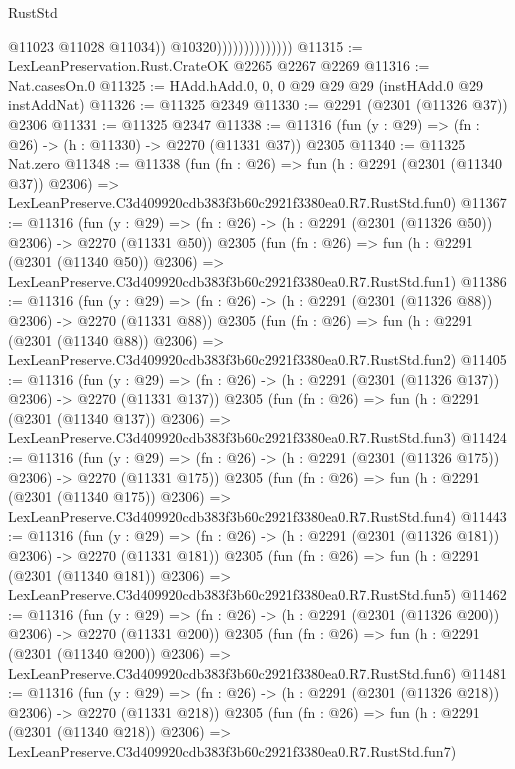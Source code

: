 \begin{lexlean}{RustStd}
\begin{coremodule}
                                    @11023
                                    @11028
                                    @11034))
                                @10320))))))))))))))
@11315 := LexLeanPreservation.Rust.CrateOK @2265 @2267 @2269
@11316 := Nat.casesOn.{0}
@11325 := HAdd.hAdd.{0, 0, 0} @29 @29 @29 (instHAdd.{0} @29 instAddNat)
@11326 := @11325 @2349
@11330 := @2291 (@2301 (@11326 @37)) @2306
@11331 := @11325 @2347
@11338 := @11316 (fun (y : @29) => (fn : @26) -> (h : @11330) -> @2270 (@11331 @37)) @2305
@11340 := @11325 Nat.zero
@11348 := @11338
    (fun (fn : @26) =>
    fun (h : @2291 (@2301 (@11340 @37)) @2306) =>
    LexLeanPreserve.C3d409920cdb383f3b60c2921f3380ea0.R7.RustStd.fun0)
@11367 := @11316
    (fun (y : @29) => (fn : @26) -> (h : @2291 (@2301 (@11326 @50)) @2306) -> @2270 (@11331 @50))
    @2305
    (fun (fn : @26) =>
    fun (h : @2291 (@2301 (@11340 @50)) @2306) =>
    LexLeanPreserve.C3d409920cdb383f3b60c2921f3380ea0.R7.RustStd.fun1)
@11386 := @11316
    (fun (y : @29) => (fn : @26) -> (h : @2291 (@2301 (@11326 @88)) @2306) -> @2270 (@11331 @88))
    @2305
    (fun (fn : @26) =>
    fun (h : @2291 (@2301 (@11340 @88)) @2306) =>
    LexLeanPreserve.C3d409920cdb383f3b60c2921f3380ea0.R7.RustStd.fun2)
@11405 := @11316
    (fun (y : @29) => (fn : @26) -> (h : @2291 (@2301 (@11326 @137)) @2306) -> @2270 (@11331 @137))
    @2305
    (fun (fn : @26) =>
    fun (h : @2291 (@2301 (@11340 @137)) @2306) =>
    LexLeanPreserve.C3d409920cdb383f3b60c2921f3380ea0.R7.RustStd.fun3)
@11424 := @11316
    (fun (y : @29) => (fn : @26) -> (h : @2291 (@2301 (@11326 @175)) @2306) -> @2270 (@11331 @175))
    @2305
    (fun (fn : @26) =>
    fun (h : @2291 (@2301 (@11340 @175)) @2306) =>
    LexLeanPreserve.C3d409920cdb383f3b60c2921f3380ea0.R7.RustStd.fun4)
@11443 := @11316
    (fun (y : @29) => (fn : @26) -> (h : @2291 (@2301 (@11326 @181)) @2306) -> @2270 (@11331 @181))
    @2305
    (fun (fn : @26) =>
    fun (h : @2291 (@2301 (@11340 @181)) @2306) =>
    LexLeanPreserve.C3d409920cdb383f3b60c2921f3380ea0.R7.RustStd.fun5)
@11462 := @11316
    (fun (y : @29) => (fn : @26) -> (h : @2291 (@2301 (@11326 @200)) @2306) -> @2270 (@11331 @200))
    @2305
    (fun (fn : @26) =>
    fun (h : @2291 (@2301 (@11340 @200)) @2306) =>
    LexLeanPreserve.C3d409920cdb383f3b60c2921f3380ea0.R7.RustStd.fun6)
@11481 := @11316
    (fun (y : @29) => (fn : @26) -> (h : @2291 (@2301 (@11326 @218)) @2306) -> @2270 (@11331 @218))
    @2305
    (fun (fn : @26) =>
    fun (h : @2291 (@2301 (@11340 @218)) @2306) =>
    LexLeanPreserve.C3d409920cdb383f3b60c2921f3380ea0.R7.RustStd.fun7)

\end{coremodule}
\end{lexlean}
